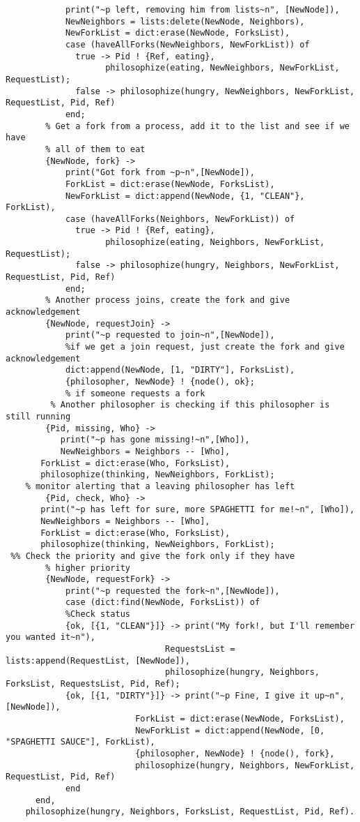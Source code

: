 \documentclass[11pt]{article}
\begin{document}
\begin{lstlisting}
            print("~p left, removing him from lists~n", [NewNode]),
            NewNeighbors = lists:delete(NewNode, Neighbors),
            NewForkList = dict:erase(NewNode, ForksList),
            case (haveAllForks(NewNeighbors, NewForkList)) of
              true -> Pid ! {Ref, eating},
                    philosophize(eating, NewNeighbors, NewForkList, RequestList);
              false -> philosophize(hungry, NewNeighbors, NewForkList, RequestList, Pid, Ref)
            end;
        % Get a fork from a process, add it to the list and see if we have
        % all of them to eat
        {NewNode, fork} -> 
            print("Got fork from ~p~n",[NewNode]),
            ForkList = dict:erase(NewNode, ForksList),
            NewForkList = dict:append(NewNode, {1, "CLEAN"}, ForkList),
            case (haveAllForks(Neighbors, NewForkList)) of
              true -> Pid ! {Ref, eating},
                    philosophize(eating, Neighbors, NewForkList, RequestList);
              false -> philosophize(hungry, Neighbors, NewForkList, RequestList, Pid, Ref)
            end;
        % Another process joins, create the fork and give acknowledgement
        {NewNode, requestJoin} ->
            print("~p requested to join~n",[NewNode]),
            %if we get a join request, just create the fork and give acknowledgement
            dict:append(NewNode, [1, "DIRTY"], ForksList),
            {philosopher, NewNode} ! {node(), ok};
            % if someone requests a fork
         % Another philosopher is checking if this philosopher is still running
    	{Pid, missing, Who} ->
           print("~p has gone missing!~n",[Who]),
           NewNeighbors = Neighbors -- [Who],
	   ForkList = dict:erase(Who, ForksList),
	   philosophize(thinking, NewNeighbors, ForkList);
    % monitor alerting that a leaving philosopher has left
    	{Pid, check, Who} ->
	   print("~p has left for sure, more SPAGHETTI for me!~n", [Who]),
	   NewNeighbors = Neighbors -- [Who],
	   ForkList = dict:erase(Who, ForksList),
	   philosophize(thinking, NewNeighbors, ForkList);
 %% Check the priority and give the fork only if they have
        % higher priority
        {NewNode, requestFork} -> 
            print("~p requested the fork~n",[NewNode]),
            case (dict:find(NewNode, ForksList)) of
            %Check status
            {ok, [{1, "CLEAN"}]} -> print("My fork!, but I'll remember you wanted it~n"),
                                RequestsList = lists:append(RequestList, [NewNode]),
                                philosophize(hungry, Neighbors, ForksList, RequestsList, Pid, Ref);
            {ok, [{1, "DIRTY"}]} -> print("~p Fine, I give it up~n",[NewNode]),
                          ForkList = dict:erase(NewNode, ForksList),
                          NewForkList = dict:append(NewNode, [0, "SPAGHETTI SAUCE"], ForkList),
                          {philosopher, NewNode} ! {node(), fork},
                          philosophize(hungry, Neighbors, NewForkList, RequestList, Pid, Ref)
            end
      end,
    philosophize(hungry, Neighbors, ForksList, RequestList, Pid, Ref).



\end{lstlisting}
\end{document}
